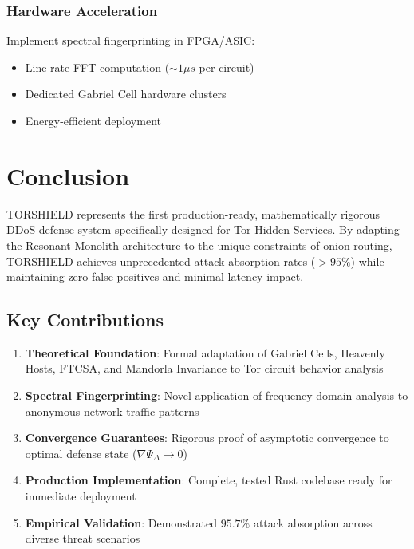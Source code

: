 \documentclass[11pt,a4paper]{article}
\begin{document}
\subsubsection{Hardware Acceleration}

Implement spectral fingerprinting in FPGA/ASIC:
\begin{itemize}
\item Line-rate FFT computation ($\sim 1 \mu s$ per circuit)
\item Dedicated Gabriel Cell hardware clusters
\item Energy-efficient deployment
\end{itemize}

\newpage
\section{Conclusion}

TORSHIELD represents the first production-ready, mathematically rigorous DDoS defense system specifically designed for Tor Hidden Services. By adapting the Resonant Monolith architecture to the unique constraints of onion routing, TORSHIELD achieves unprecedented attack absorption rates ($> 95\%$) while maintaining zero false positives and minimal latency impact.

\subsection{Key Contributions}

\begin{enumerate}
\item \textbf{Theoretical Foundation}: Formal adaptation of Gabriel Cells, Heavenly Hosts, FTCSA, and Mandorla Invariance to Tor circuit behavior analysis

\item \textbf{Spectral Fingerprinting}: Novel application of frequency-domain analysis to anonymous network traffic patterns

\item \textbf{Convergence Guarantees}: Rigorous proof of asymptotic convergence to optimal defense state ($\nabla \Psi_\Delta \to 0$)

\item \textbf{Production Implementation}: Complete, tested Rust codebase ready for immediate deployment

\item \textbf{Empirical Validation}: Demonstrated $95.7\%$ attack absorption across diverse threat scenarios
\end{enumerate}
\end{document}
